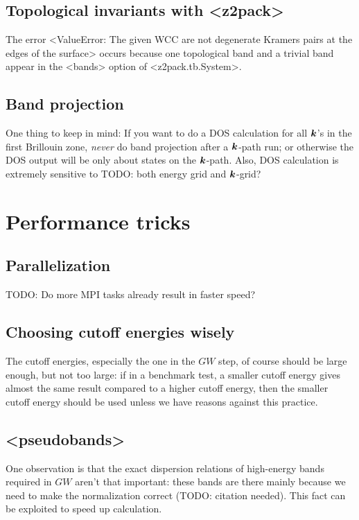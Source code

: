 \documentclass[hyperref, a4paper]{report}
\def\texttt#1{<#1>}%
\newcommand{\shortcode}[1]{\texttt{#1}}
\begin{document}
\subsection{Topological invariants with \shortcode{z2pack}}

The error \shortcode{ValueError: The given WCC are not degenerate Kramers pairs at the edges of the surface}
occurs because one topological band and a trivial band appear in the \shortcode{bands} option 
of \shortcode{z2pack.tb.System}.

\subsection{Band projection}

One thing to keep in mind: 
If you want to do a DOS calculation for all $\vb*{k}$'s in the first Brillouin zone,
\emph{never} do band projection after a $\vb*{k}$-path run;
or otherwise the DOS output will be only about states on the $\vb*{k}$-path.
Also, DOS calculation is extremely sensitive to TODO: both energy grid and $\vb*{k}$-grid?

\section{Performance tricks}

\subsection{Parallelization}

TODO: Do more MPI tasks already result in faster speed?

\subsection{Choosing cutoff energies wisely}

The cutoff energies, especially the one in the $GW$ step,
of course should be large enough, but not too large:
if in a benchmark test, 
a smaller cutoff energy gives almost the same result 
compared to a higher cutoff energy,
then the smaller cutoff energy should be used 
unless we have reasons against this practice.

\subsection{\shortcode{pseudobands}}

One observation is that the exact dispersion relations of high-energy bands required in $GW$ 
aren't that important:
these bands are there mainly because 
we need to make the normalization correct
(TODO: citation needed).
This fact can be exploited to speed up calculation.
\end{document}
